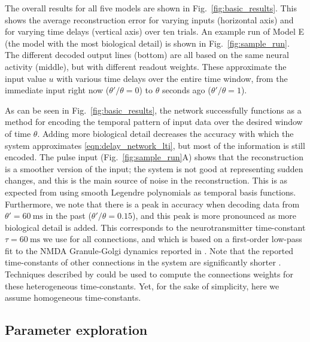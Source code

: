 The overall results for all five models are shown in Fig.~\ref{fig:basic_results}.
This shows the average reconstruction error for varying inputs (horizontal axis) and for varying time delays (vertical axis) over ten trials.
An example run of Model E (the model with the most biological detail) is shown in Fig.~\ref{fig:sample_run}.
The different decoded output lines (bottom) are all based on the same neural activity (middle), but with different readout weights.
These approximate the input value $u$ with various time delays over the entire time window, from the immediate input right now ($\theta'/\theta=0$) to $\theta$ seconds ago ($\theta'/\theta=1$).  

As can be seen in Fig.~\ref{fig:basic_results}, the network successfully functions as a method for encoding the temporal pattern of input data over the desired window of time $\theta$.
Adding more biological detail decreases the accuracy with which the system approximates \cref{eqn:delay_network_lti}, but most of the information is still encoded.
The pulse input (Fig.~\ref{fig:sample_run}A) shows that the reconstruction is a smoother version of the input; the system is not good at representing sudden changes, and this is the main source of noise in the reconstruction.  This is as expected from using smooth Legendre polynomials as temporal basis functions. Furthermore, we note that there is a peak in accuracy when decoding data from $\theta' = \SI{60}{\milli\second}$ in the past ($\theta'/\theta=0.15$), and this peak is more pronounced as more biological detail is added. This corresponds to the neurotransmitter time-constant $\tau = \SI{60}{\milli\second}$ we use for all connections, and which is based on a first-order low-pass fit to the NMDA Granule-Golgi dynamics reported in \citet{dieudonne1998submillisecond}. Note that the reported time-constants of other connections in the system are significantly shorter \cite{kanichay2008synaptic}. Techniques described by \cite{voelker2018improving} could be used to compute the connections weights for these heterogeneous time-constants. Yet, for the sake of simplicity, here we assume homogeneous time-constants.

\subsection{Parameter exploration}

